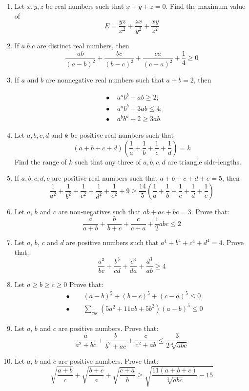 \documentclass{article}
\begin{document}
\begin{enumerate}
 \item  Let $x,y,z$ be real numbers such that $x+y+z=0$. Find the maximum value of
\[E=\frac {yz}{x^2}+\frac {zx}{y^2}+\frac {xy}{z^2}\]
 \item  If $a.b.c$ are distinct real numbers, then
\[\frac {ab}{(a-b)^2}+\frac {bc}{(b-c)^2}+\frac {ca}{(c-a)^2} +\frac 1{4} \ge 0\]

 \item  If $a$ and $b$ are nonnegative real numbers such that $a+b=2$, then

\[\begin{aligned}&\bullet\ \ \ \ \  a^ab^b+ab\ge 2;\\&\bullet \ \ \ \ \  a^ab^b+3ab\le 4;\\&\bullet \ \ \ \ \  a^bb^a+2\ge 3ab.\end{aligned}\]

 \item  Let $a,b,c,d$ and $k$ be positive real numbers such that
\[\left(a+b+c+d\right)\left(\frac 1{a}+\frac 1{b}+\frac 1{c}+\frac 1{d}\right)=k\]
Find the range of $k$ such that any three of $a,b,c,d$ are triangle side-lengths.

\item  If $a,b,c,d,e$ are positive real numbers such that $a+b+c+d+e=5$, then
\[\frac 1{a^2}+\frac 1{b^2}+\frac 1{c^2}+\frac 1{d^2}+\frac 1{e^2}+9\ge \frac {14}{5}\left(\frac 1{a}+\frac 1{b}+\frac 1{c}+\frac 1{d}+\frac 1{e}\right)\]

\item  Let $a$, $b$ and $c$ are non-negatives such that $ab+ac+bc=3$. Prove that:
\[\frac {a}{a+b}+\frac {b}{b+c}+\frac {c}{c+a}+\frac {1}{2}abc\leq2\]

\item  Let $a$, $b$, $c$ and $d$ are positive numbers such that $a^4+b^4+c^4+d^4=4$. Prove that:
\[\frac {a^3}{bc}+\frac {b^3}{cd}+\frac {c^3}{da}+\frac {d^3}{ab}\geq4\]

\item   Let $a\geq b\geq c\geq0$ Prove that:
\[\begin{aligned} &\bullet \qquad (a-b)^5+(b-c)^5+(c-a)^5\leq0\\&\bullet \qquad \sum_{cyc}(5a^2+11ab+5b^2)(a-b)^5\leq0\end{aligned}\]
 \item  Let $a$, $b$ and $c$ are positive numbers. Prove that:
\[\frac {a}{a^2+bc}+\frac {b}{b^2+ac}+\frac {c}{c^2+ab}\leq\frac {3}{2\sqrt[3]{abc}}\]

\item  Let $a$, $b$ and $c$ are positive numbers. Prove that:
\[\sqrt{\frac {a+b}{c}} + \sqrt{\frac {b+c}{a}}  +\sqrt{\frac {c+a}{b}} \geq \sqrt{\frac {11(a+b+c)}{\sqrt[3]{abc}}-15}\]


\end{enumerate}
\end{document}
